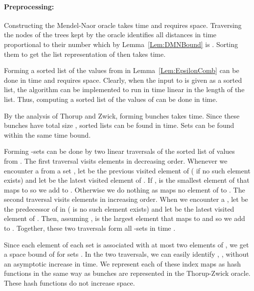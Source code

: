 \documentclass[11pt]{article}
\begin{document}
\paragraph{Preprocessing:} Constructing the Mendel-Naor oracle takes
 time and requires  space. Traversing the nodes of the trees kept by
the oracle identifies all distances in time proportional to their number which by Lemma~\ref{Lem:DMNBound} is .
Sorting them to get the list representation of  then takes  time.

Forming a sorted list of the values from  in Lemma~\ref{Lem:EpsilonComb} can be done in
 time and requires
 space.
Clearly, when the input to  is given as a sorted list, the algorithm can be implemented to run in time linear in
the length of the list. Thus, computing a sorted list of the values of  can be done in
 time.

By the analysis of Thorup and Zwick, forming bunches  takes  time.
Since these bunches have total size
, sorted lists  can be found in  time. Sets  can be found within the
same time bound.

Forming -sets can be done by two linear traversals of the sorted list  of values from
. The first traversal visits elements in decreasing order. Whenever we encounter
a  from a set , let  be the previous visited element of  ( if no such element exists)
and let  be the latest visited element of . If ,
 is the smallest element of  that  maps to
 so we add  to . Otherwise we do nothing as  maps no element of
 to . The second traversal visits elements in
increasing order. When we encounter a , let  be the predecessor of  in  ( is no such element
exists) and let  be the latest visited
element of . Then, assuming ,  is the largest element that  maps
to  and so we add  to . Together, these two traversals form
all -sets in time .

Since each element of each set  is associated with at most two elements of , we get a
space bound of  for sets . In the two traversals, we can easily identify ,
, without an asymptotic increase in time. We represent each of
these index maps as hash functions in the same way as bunches  are represented in the Thorup-Zwick oracle. These hash functions
do not increase space.
\end{document}
